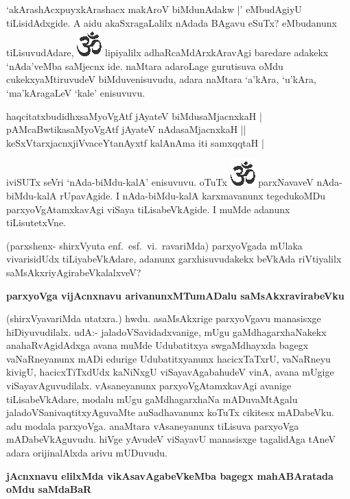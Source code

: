 `akArashAcxpuyxkArashacx makAroV biMdunAdakw |' eMbudAgiyU tiLisidAdxgide. A aidu akaSxragaLalilx nAdada BAgavu eSuTx? eMbudanunx tiLisuvudAdare, {\includegraphics[scale=.6]{om.eps}} lipiyalilx adhaRcaMdArxkAravAgi baredare adakekx `nAda'veMba saMjecnx ide. naMtara adaroLage gurutisuva oMdu cukekxyaMtiruvudeV biMduvenisuvudu, adara naMtara `a'kAra, `u'kAra, `ma'kAragaLeV `kale' enisuvuvu. 

\begin{shloka}
haqcitatxbudidhxsaMyoVgAtf jAyateV biMdusaMjacnxkaH |\\\label{161b}
pAMcaBwtikasaMyoVgAtf jAyateV nAdasaMjacnxkaH ||\\
keSxVtarxjacnxjiVvaceYtanAyxtf kalAnAma iti samxqqtaH |
\end{shloka}

\noindent
iviSUTx seVri `nAda-biMdu-kalA' enisuvuvu. oTuTx {\includegraphics[scale=.6]{om.eps}} parxNavaveV nAda-biMdu-kalA rUpavAgide. I nAda-biMdu-kalA karxmavanunx tegedukoMDu parxyoVgAtamxkavAgi viSaya tiLisabeVkAgide. I muMde adanunx tiLisutetxVne.

(parxshenx- shirxVyuta enf.~esf.~vi.~ravariMda) parxyoVgada mUlaka vivarisidUdx tiLiyabeVkAdare, adanunx garxhisuvudakekx beVkAda riVtiyalilx saMsAkxriyAgirabeVkalalxveV?

{\bigskip
\noindent
{\large\bf parxyoVga vijAcnxnavu arivanunxMTumADalu saMsAkxravirabeVku}}
\medskip

\noindent
(shirxVyavariMda utatxra.) hwdu. asaMsAkxrige parxyoVgavu manasisxge hiDiyuvudilalx. udA:- jaladoVSavidadxvanige, mUgu gaMdhagarxhaNakekx anahaRvAgidAdxga avana muMde Udubatitxya swgaMdhayxda bagegx vaNaRneyanunx mADi edurige Udubatitxyanunx hacicxTaTxrU, vaNaRneyu kivigU, hacicxTiTxdUdx kaNiNxgU viSayavAgabahudeV vinA, avana mUgige viSayavAguvudilalx. vAsaneyanunx parxyoVgAtamxkavAgi avanige tiLisabeVkAdare, modalu mUgu gaMdhagarxhaNa mADuvaMtAgalu jaladoVSanivaqtitxyAguvaMte auSadhavanunx koTuTx cikitesx mADabeVku. adu modala parxyoVga. anaMtara vAsaneyanunx tiLisuva parxyoVga mADabeVkAguvudu. hiVge yAvudeV viSayavU manasisxge tagalidAga tAneV adara orijinalAlxda arivu mUDuvudu.

{\bigskip
\noindent
{\large\bf jAcnxnavu elilxMda vikAsavAgabeVkeMba bagegx mahABAratada oMdu saMdaBaR}}\label{page162}
\medskip


